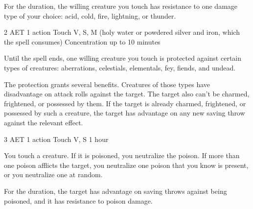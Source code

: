 For the duration, the willing creature you touch has resistance to one damage type of your choice: acid, cold, fire, lightning, or thunder.

\label{spell:protection-from-evil-and-good}
{2 AET}
{1 action}
{Touch}
{V, S, M (holy water or powdered silver and iron, which the spell consumes)}
{Concentration up to 10 minutes}

Until the spell ends, one willing creature you touch is protected against certain types of creatures: aberrations, celestials, elementals, fey, fiends, and undead.

The protection grants several benefits. Creatures of those types have disadvantage on attack rolls against the target. The target also can't be charmed, frightened, or possessed by them. If the target is already charmed, frightened, or possessed by such a creature, the target has advantage on any new saving throw against the relevant effect.

\label{spell:protection-from-poison}
{3 AET}
{1 action}
{Touch}
{V, S}
{1 hour}

You touch a creature. If it is poisoned, you neutralize the poison. If more than one poison afflicts the target, you neutralize one poison that you know is present, or you neutralize one at random.

For the duration, the target has advantage on saving throws against being poisoned, and it has resistance to poison damage.